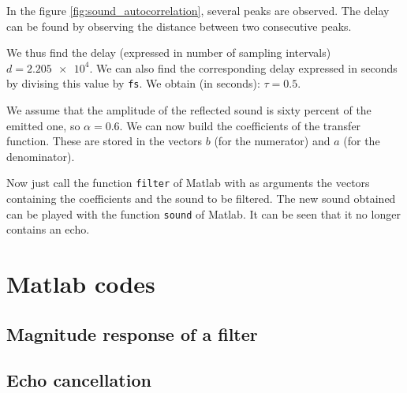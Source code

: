 \documentclass[a4paper, 12pt]{article}
\begin{document}
	In the figure \ref{fig:sound_autocorrelation}, several peaks are observed. The delay can be found by observing the distance between two consecutive peaks.\par
	We thus find the delay (expressed in number of sampling intervals) $d = \num{2.205e4}$. We can also find the corresponding delay expressed in seconds by divising this value by \texttt{fs}. We obtain (in seconds): $\tau = \num{0.5}$.\par
	We assume that the amplitude of the reflected sound is sixty percent of the emitted one, so $\alpha = 0.6$. We can now build the coefficients of the transfer function. These are stored in the vectors $b$ (for the numerator) and $a$ (for the denominator).\par
	Now just call the function \texttt{filter} of Matlab with as arguments the vectors containing the coefficients and the sound to be filtered. The new sound obtained can be played with the function \texttt{sound} of Matlab. It can be seen that it no longer contains an echo.
	\newpage
	\appendix
	\section{Matlab codes}
	\subsection{Magnitude response of a filter}
	
	\subsection{Echo cancellation}
	
\end{document}
